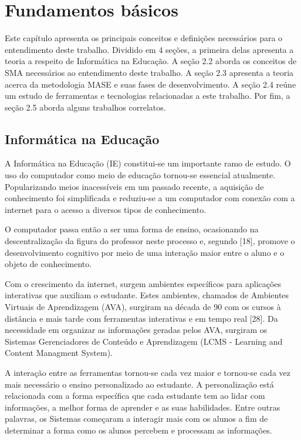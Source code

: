 \chapter{Fundamentos básicos}

Este capítulo apresenta os principais conceitos e definições necessários para o entendimento deste trabalho. Dividido em 4 seções, a primeira delas apresenta a teoria a respeito de Informática na Educação. A seção 2.2 aborda os conceitos de SMA necessários ao entendimento deste trabalho. A seção 2.3 apresenta a teoria acerca da metodologia MASE e suas fases de desenvolvimento. A seção 2.4 reúne um estudo de ferramentas e tecnologias relacionadas a este trabalho. Por fim, a seção 2.5 aborda alguns trabalhos correlatos.

\section{Informática na Educação}
A Informática na Educação (IE) constitui-se um importante ramo de estudo. O uso do computador como meio de educação tornou-se essencial atualmente. Popularizando meios inacessíveis em um passado recente, a aquisição de conhecimento foi simplificada e reduziu-se a um computador com conexão com a internet para o acesso a diversos tipos de conhecimento.
 
O computador passa então a ser uma forma de ensino, ocasionando na descentralização da figura do professor neste processo e, segundo [18], promove o desenvolvimento cognitivo por meio de uma interação maior entre o aluno e o objeto de conhecimento.
 
Com o crescimento da internet, surgem ambientes específicos para aplicações interativas que auxiliam o estudante. Estes ambientes, chamados de Ambientes Virtuais de Aprendizagem (AVA), surgiram na década de 90 com os cursos à distância e mais tarde com ferramentas interativas e em tempo real [28]. Da necessidade em organizar as informações geradas pelos AVA, surgiram os Sistemas Gerenciadores de Conteúdo e Aprendizagem (LCMS - Learning and Content Managment System).
 
A interação entre as ferramentas tornou-se cada vez maior e tornou-se cada vez mais necessário o ensino personalizado ao estudante. A personalização está relacionada com a forma específica que cada estudante tem ao lidar com informações, a melhor forma de aprender e as suas habilidades. Entre outras palavras, os Sistemas começaram a interagir mais com os alunos a fim de determinar a forma como os alunos percebem e processam as informações.

